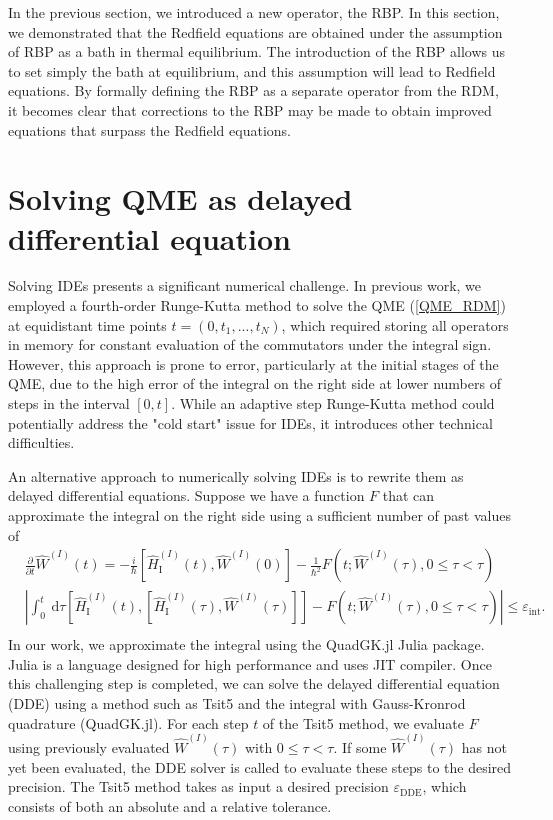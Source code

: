 In the previous section, we introduced a new operator, the RBP. In this section, we demonstrated that the Redfield equations are obtained under the assumption of RBP as a bath in thermal equilibrium. The introduction of the RBP allows us to set simply the bath at equilibrium, and this assumption will lead to Redfield equations. By formally defining the RBP as a separate operator from the RDM, it becomes clear that corrections to the RBP may be made to obtain improved equations that surpass the Redfield equations. 

\section{Solving QME as delayed differential equation}
\label{Solving QME as delayed differential equation}
Solving IDEs presents a significant numerical challenge. In previous work, we employed a fourth-order Runge-Kutta method to solve the QME (\ref{QME_RDM}) at equidistant time points $t=(0, t_1, ..., t_N)$, which required storing all operators in memory for constant evaluation of the commutators under the integral sign. However, this approach is prone to error, particularly at the initial stages of the QME, due to the high error of the integral on the right side at lower numbers of steps in the interval $[0, t]$. While an adaptive step Runge-Kutta method could potentially address the "cold start" issue for IDEs, it introduces other technical difficulties.

An alternative approach to numerically solving IDEs is to rewrite them as delayed differential equations. Suppose we have a function $F$ that can approximate the integral on the right side using a sufficient number of past values of 
\begin{equation}
    \begin{aligned}
    &\frac{\partial}{\partial t} \hat{W}^{(I)}(t) = -\frac{i}{\hbar}\left[\hat{H}_{\mathrm{I}}^{(I)}(t), \hat{W}^{(I)}(0)\right] -\frac{1}{\hbar^{2}}  F\left(t; \hat{W}^{(I)}(\tau), 0 \leq \tau < \tau\right)\\
    &\left|\int_{0}^{t} \mathrm{~d} \tau\left[\hat{H}_{\mathrm{I}}^{(I)}(t),\left[\hat{H}_{\mathrm{I}}^{(I)}(\tau), \hat{W}^{(I)}(\tau)\right]\right] - F\left(t; \hat{W}^{(I)}(\tau), 0 \leq \tau < \tau\right) \right| \leq \varepsilon_\text{int}.\\
    \end{aligned}
\end{equation}
In our work, we approximate the integral using the QuadGK.jl Julia package. Julia is a language designed for high performance and uses JIT compiler. Once this challenging step is completed, we can solve the delayed differential equation (DDE) using a method such as Tsit5 and the integral with Gauss-Kronrod quadrature (QuadGK.jl). For each step $t$ of the Tsit5 method, we evaluate $F$ using previously evaluated $\hat{W}^{(I)}(\tau)$ with $0 \leq \tau < \tau$. If some $\hat{W}^{(I)}(\tau)$ has not yet been evaluated, the DDE solver is called to evaluate these steps to the desired precision. The Tsit5 method takes as input a desired precision $\varepsilon_\text{DDE}$, which consists of both an absolute and a relative tolerance.

